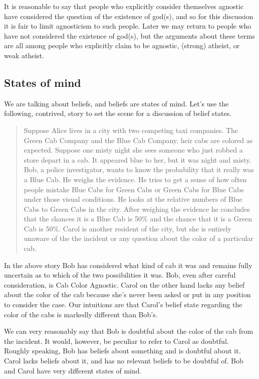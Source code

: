 \documentclass[12pt]{article}
\begin{document}
It is reasonable to say that people who explicitly consider themselves agnostic have considered the question of the existence of god(s), and so for this discussion it is fair to limit agnosticism to such people.
Later we may return to people who have not considered the existence of god(s), but the arguments about these terms are all among people who explicitly claim to be agnostic, (strong) atheist, or weak atheist.

\subsection{States of mind}

We are talking about beliefs, and beliefs are states of mind.
Let's use the following, contrived, story to set the scene for a discussion of belief states.

\begin{quote}
Suppose Alice lives in a city with two competing taxi companies.
The Green Cab Company and the Blue Cab Company. 
heir cabs are colored as expected. Suppose one misty night she sees someone who just robbed a store depart in a cab.
It appeared blue to her, but it was night and misty.
Bob, a police investigator, wants to know the probability that it really was a Blue Cab.
He weighs the evidence. He tries to get a sense of how often people mistake Blue Cabs for Green Cabs or Green Cabs for Blue Cabs under those visual conditions. He looks at the relative numbers of Blue Cabs to Green Cabs in the city.
After weighing the evidence he concludes that the chances it is a Blue Cab is 50\% and the chance that it is a Green Cab is 50\%.
Carol is another resident of the city, but she is entirely unaware of the the incident or any question about the color of a particular cab.
\end{quote}

In the above story Bob has considered what kind of cab it was and remains fully uncertain as to which of the two possibilities it was.
Bob, even after careful consideration, is Cab Color Agnostic.
Carol on the other hand lacks any belief about the color of the cab because she's never been asked or put in any position to consider the case.
Our intuitions are that Carol's belief state regarding the color of the cabs is markedly different than Bob's. 

We can very reasonably say that Bob is doubtful about the color of the cab from the incident. It would, however, be peculiar to refer to Carol as doubtful. Roughly speaking, Bob has beliefs about something and is doubtful about it. Carol lacks beliefs about it, and has no relevant beliefs to be doubtful of.
Bob and Carol have very different states of mind.
\end{document}
